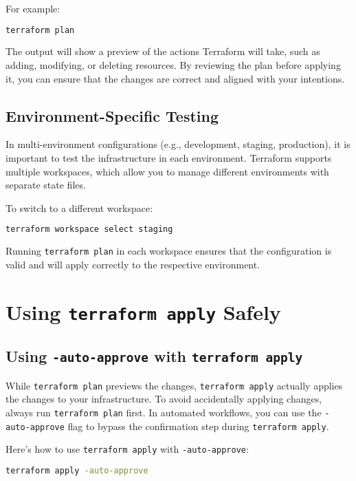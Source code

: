 For example:

\begin{lstlisting}[language=bash]
terraform plan
\end{lstlisting}

The output will show a preview of the actions Terraform will take, such as adding, modifying, or deleting resources. By reviewing the plan before applying it, you can ensure that the changes are correct and aligned with your intentions.

\subsection{Environment-Specific Testing}

In multi-environment configurations (e.g., development, staging, production), it is important to test the infrastructure in each environment. Terraform supports multiple workspaces, which allow you to manage different environments with separate state files.

To switch to a different workspace:

\begin{lstlisting}[language=bash]
terraform workspace select staging
\end{lstlisting}

Running \texttt{terraform plan} in each workspace ensures that the configuration is valid and will apply correctly to the respective environment.

\section{Using \texttt{terraform apply} Safely}
\subsection{Using \texttt{-auto-approve} with \texttt{terraform apply}}

While \texttt{terraform plan} previews the changes, \texttt{terraform apply} actually applies the changes to your infrastructure. To avoid accidentally applying changes, always run \texttt{terraform plan} first. In automated workflows, you can use the \texttt{-auto-approve} flag to bypass the confirmation step during \texttt{terraform apply}.

Here's how to use \texttt{terraform apply} with \texttt{-auto-approve}:

\begin{lstlisting}[language=bash]
terraform apply -auto-approve
\end{lstlisting}

